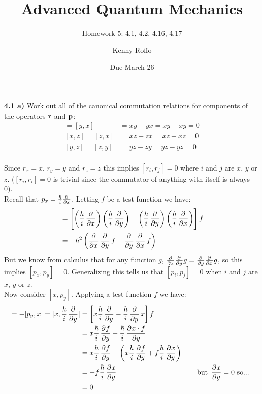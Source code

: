 \documentclass{scrartcl}
\title{Advanced Quantum Mechanics}
\subtitle{Homework 5: 4.1, 4.2, 4.16, 4.17}
\author{Kenny Roffo}
\date{Due March 26}
\begin{document}
\maketitle

\textbf{4.1 a)} Work out all of the canonical commutation relations for components of the operators $\vb{r}$ and $\vb{p}$:
\begin{align*}
[x,y]=[y,x]&=xy-yx=xy-xy=0\\
[x,z]=[z,x]&=xz-zx=xz-xz=0\\
[y,z]=[z,y]&=yz-zy=yz-yz=0
\end{align*}\\
Since $r_x=x$, $r_y=y$ and $r_z=z$ this implies $[r_i,r_j]=0$ where $i$ and $j$ are $x$, $y$ or $z$. ($[r_i,r_i]=0$ is trivial since the commutator of anything with itself is always 0).\\

Recall that $p_x=\frac{\hbar}{i} \pd{}{x}$. Letting $f$ be a test function we have:
\begin{align*}
[p_x,p_y]&=\left[\left(\frac{\hbar}{i} \dpd{}{x}\right)\left(\frac{\hbar}{i} \dpd{}{y}\right)-\left(\frac{\hbar}{i} \dpd{}{y}\right)\left(\frac{\hbar}{i} \dpd{}{x}\right)\right]f\\
&=-\hbar^2\left(\dpd{}{x}\dpd{}{y}f-\dpd{}{y}\dpd{}{x}f\right)
\end{align*}
But we know from calculus that for any function $g$, $\pd{}{x}\pd{}{y}g = \pd{}{y}\pd{}{x}g$, so this implies $[p_x,p_y]=0$. Generalizing this tells us that $[p_i,p_j]=0$ when $i$ and $j$ are $x$, $y$ or $z$.\\

Now consider $[x,p_y]$. Applying a test function $f$ we have:
\begin{align*}
[x,p_y]=-[p_y,x]=[x,\frac{\hbar}{i} \dpd{}{y}]&=\left[x\frac{\hbar}{i} \dpd{}{y} - \frac{\hbar}{i} \dpd{}{y}x\right]f\\
&=x\frac{\hbar}{i} \dpd{f}{y}-\frac{\hbar}{i} \dpd{x\cdot f}{y}\\
&=x\frac{\hbar}{i} \dpd{f}{y}-\left(x\frac{\hbar}{i} \dpd{f}{y} + f\frac{\hbar}{i} \dpd{x}{y}\right)\\
&=-f\frac{\hbar}{i}\dpd{x}{y} \text{\hspace{1.5 in} but } \dpd{x}{y}=0 \text{ so... }\\
&=0
\end{align*}
\end{document}
